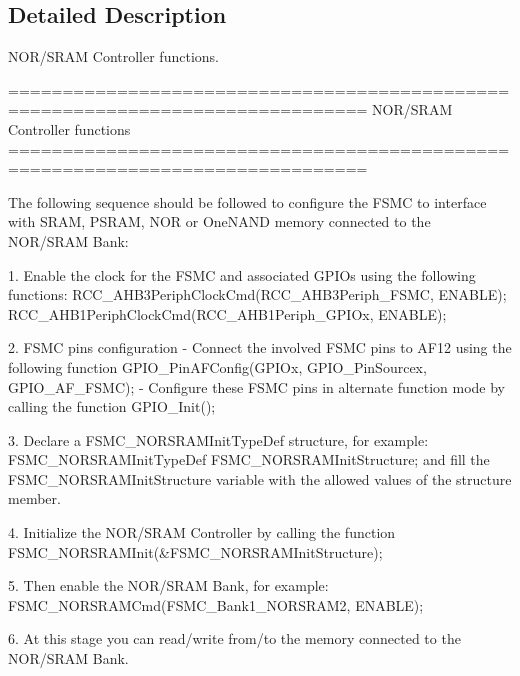 \subsection{Detailed Description}
N\-O\-R/\-S\-R\-A\-M Controller functions. \begin{DoxyVerb} ===============================================================================
                    NOR/SRAM Controller functions
 ===============================================================================  

 The following sequence should be followed to configure the FSMC to interface with
 SRAM, PSRAM, NOR or OneNAND memory connected to the NOR/SRAM Bank:
 
   1. Enable the clock for the FSMC and associated GPIOs using the following functions:
          RCC_AHB3PeriphClockCmd(RCC_AHB3Periph_FSMC, ENABLE);
          RCC_AHB1PeriphClockCmd(RCC_AHB1Periph_GPIOx, ENABLE);

   2. FSMC pins configuration 
       - Connect the involved FSMC pins to AF12 using the following function 
          GPIO_PinAFConfig(GPIOx, GPIO_PinSourcex, GPIO_AF_FSMC); 
       - Configure these FSMC pins in alternate function mode by calling the function
          GPIO_Init();    
       
   3. Declare a FSMC_NORSRAMInitTypeDef structure, for example:
          FSMC_NORSRAMInitTypeDef  FSMC_NORSRAMInitStructure;
      and fill the FSMC_NORSRAMInitStructure variable with the allowed values of
      the structure member.
      
   4. Initialize the NOR/SRAM Controller by calling the function
          FSMC_NORSRAMInit(&FSMC_NORSRAMInitStructure); 

   5. Then enable the NOR/SRAM Bank, for example:
          FSMC_NORSRAMCmd(FSMC_Bank1_NORSRAM2, ENABLE);  

   6. At this stage you can read/write from/to the memory connected to the NOR/SRAM Bank. \end{DoxyVerb}
 

